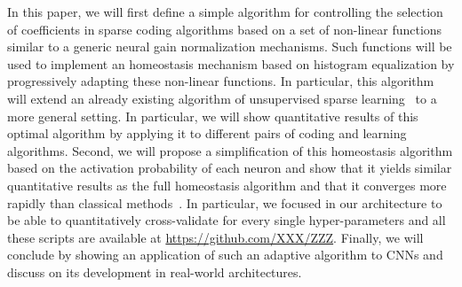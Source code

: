 \documentclass[draft]{article} %
\begin{document}
In this paper, we will first define a simple algorithm for controlling the selection of coefficients in sparse coding algorithms based on a set of non-linear functions similar to a generic neural gain normalization mechanisms. Such functions will be used to implement an homeostasis mechanism based on histogram equalization by progressively adapting these non-linear functions. In particular, this algorithm will extend an already existing algorithm of unsupervised sparse learning~\citep{Perrinet10shl} to a more general setting. In particular, we will show quantitative results of this optimal algorithm by applying it to different pairs of coding and learning algorithms. Second, we will propose a simplification of this homeostasis algorithm based on the activation probability of each neuron and show that it yields similar quantitative results as the full homeostasis algorithm and that it converges more rapidly than classical methods~\citep{Olshausen97, Sandin17}. In particular, we focused in our architecture to be able to quantitatively cross-validate for every single hyper-parameters and all these scripts are available at \url{https://github.com/XXX/ZZZ}. %
Finally, we will conclude by showing an application of such an adaptive algorithm to CNNs and discuss on its development in real-world architectures.
%
%
\end{document}
